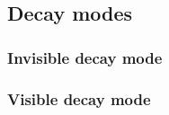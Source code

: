 \subsection{Decay modes}
\label{chapter1:sec:dm-decay}

\subsubsection{Invisible decay mode}
\label{chapter1:sec:dm-decay-invis}

\subsubsection{Visible decay mode}
\label{chapter1:sec:dm-decay-vis}

